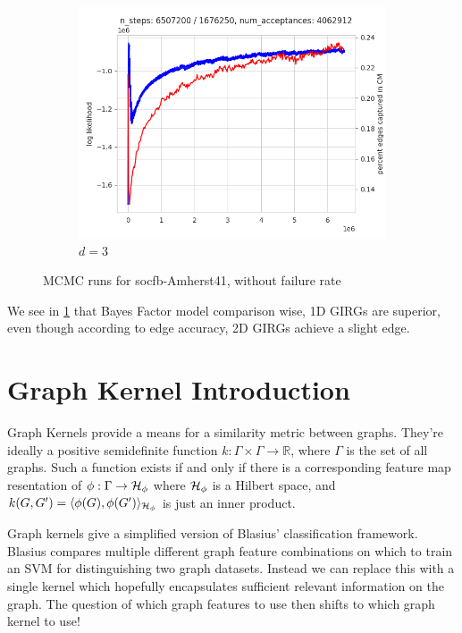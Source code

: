 \begin{figure}
    \begin{subfigure}{0.49\textwidth}
      \centering
      \includegraphics[width=\linewidth]{figures/socfb-Amherst41-3d.png}
      \caption{$d=3$}
    \end{subfigure}
    \hfill
  
    \caption{MCMC runs for socfb-Amherst41, without failure rate}
    \label{fig:amherst_non_failure_mcmc}
\end{figure}

We see in \cref{fig:amherst_non_failure_mcmc} that Bayes Factor model comparison wise, 1D GIRGs are superior, even though according to edge accuracy, 2D GIRGs achieve a slight edge.


\section{Graph Kernel Introduction}
Graph Kernels provide a means for a similarity metric between graphs. They're ideally a positive semidefinite function $k: \Gamma \times \Gamma \rightarrow \mathbb{R}$, where $\Gamma$ is the set of all graphs. Such a function exists if and only if there is a corresponding feature map resentation of $\phi: \Gamma \to \mathcal{H}_\phi$ where $\mathcal{H}_\phi$ is a Hilbert space, and $k(G, G') = \langle \phi(G), \phi(G') \rangle_{\mathcal{H}_\phi}$ is just an inner product.

Graph kernels give a simplified version of Blasius' classification framework. Blasius compares multiple different graph feature combinations on which to train an SVM for distinguishing two graph datasets. Instead we can replace this with a single kernel which hopefully encapsulates sufficient relevant information on the graph. The question of which graph features to use then shifts to which graph kernel to use!

